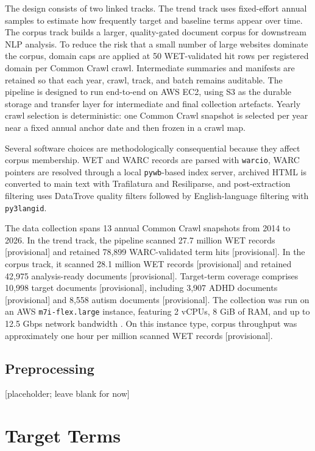 The design consists of two linked tracks. The trend track uses fixed-effort annual samples to estimate how frequently target and baseline terms appear over time. The corpus track builds a larger, quality-gated document corpus for downstream NLP analysis. To reduce the risk that a small number of large websites dominate the corpus, domain caps are applied at 50 WET-validated hit rows per registered domain per Common Crawl crawl. Intermediate summaries and manifests are retained so that each year, crawl, track, and batch remains auditable. The pipeline is designed to run end-to-end on AWS EC2, using S3 as the durable storage and transfer layer for intermediate and final collection artefacts. Yearly crawl selection is deterministic: one Common Crawl snapshot is selected per year near a fixed annual anchor date and then frozen in a crawl map.

Several software choices are methodologically consequential because they affect corpus membership. WET and WARC records are parsed with \texttt{warcio}, WARC pointers are resolved through a local \texttt{pywb}-based index server, archived HTML is converted to main text with Trafilatura and Resiliparse, and post-extraction filtering uses DataTrove quality filters followed by English-language filtering with \texttt{py3langid}.

The data collection spans 13 annual Common Crawl snapshots from 2014 to 2026. In the trend track, the pipeline scanned 27.7 million WET records [provisional] and retained 78,899 WARC-validated term hits [provisional]. In the corpus track, it scanned 28.1 million WET records [provisional] and retained 42,975 analysis-ready documents [provisional]. Target-term coverage comprises 10,998 target documents [provisional], including 3,907 ADHD documents [provisional] and 8,558 autism documents [provisional]. The collection was run on an AWS \texttt{m7i-flex.large} instance, featuring 2 vCPUs, 8 GiB of RAM, and up to 12.5 Gbps network bandwidth \citep{CloudComputingServices}. On this instance type, corpus throughput was approximately one hour per million scanned WET records [provisional].


\subsection{Preprocessing}

[placeholder; leave blank for now]

\section{Target Terms}

